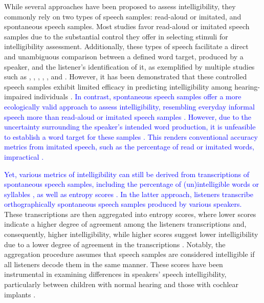 \documentclass[
  authoryear,
  preprint,
  1p]{elsarticle}
\begin{document}
While several approaches have been proposed to assess intelligibility,
they commonly rely on two types of speech samples: read-aloud or
imitated, and spontaneous speech samples. Most studies favor read-aloud
or imitated speech samples due to the substantial control they offer in
selecting stimuli for intelligibility assessment. Additionally, these
types of speech facilitate a direct and unambiguous comparison between a
defined word target, produced by a speaker, and the listener's
identification of it, as exemplified by multiple studies such as
\citet{Castellanos_et_al_2014}, \citet{Chin_et_al_2012},
\citet{Chin_et_al_2014}, \citet{Freeman_et_al_2017},
\citet{Khwaileh_et_al_2010}, and \citet{Montag_et_al_2014}. However, it
has been demonstrated that these controlled speech samples exhibit
limited efficacy in predicting intelligibility among hearing-impaired
individuals \citep{Cox_et_al_1989, Ertmer_2011}. \textcolor{blue}{In contrast,
spontaneous speech samples offer a more ecologically valid approach to
assess intelligibility, resembling everyday informal speech more than
read-aloud or imitated speech samples \citep{Boonen_et_al_2023}.
However, due to the uncertainty surrounding the speaker's intended word
production, it is unfeasible to establish a word target for these
samples \citep{Flipsen_2006, Lagerberg_et_al_2014}. This renders
conventional accuracy metrics from imitated speech, such as the
percentage of read or imitated words, impractical
\citep{Boonen_et_al_2023}.}

\textcolor{blue}{Yet, various metrics of intelligibility can still be derived from
transcriptions of spontaneous speech samples, including the percentage
of (un)intelligible words or syllables
\citep{Flipsen_2006, Lagerberg_et_al_2014}, as well as entropy scores
\citep{Boonen_et_al_2023}. In the latter approach, listeners transcribe
orthographically spontaneous speech samples produced by various
speakers.} These transcriptions are then aggregated into entropy scores,
where lower scores indicate a higher degree of agreement among the
listeners transcriptions and, consequently, higher intelligibility,
while higher scores suggest lower intelligibility due to a lower degree
of agreement in the transcriptions
\citep{Boonen_et_al_2023, Faes_et_al_2022}. Notably, the aggregation
procedure assumes that speech samples are considered intelligible if all
listeners decode them in the same manner. These scores have been
instrumental in examining differences in speakers' speech
intelligibility, particularly between children with normal hearing and
those with cochlear implants \citep{Boonen_et_al_2023}.
\end{document}
